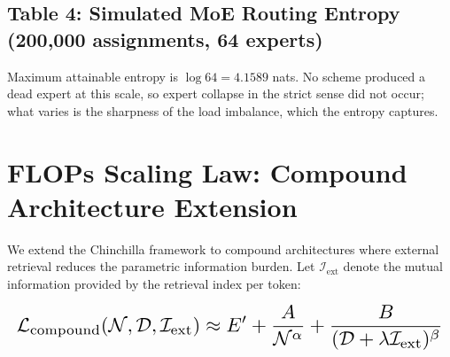 \documentclass{article}
\begin{document}
\subsection{Table 4: Simulated MoE Routing Entropy (200{,}000 assignments, 64 experts)}
\begin{table}[htbp]
\centering
{}
\end{table}

Maximum attainable entropy is $\log 64 = 4.1589$ nats. No scheme produced a dead expert at this scale, so expert collapse in the strict sense did not occur; what varies is the sharpness of the load imbalance, which the entropy captures.



\section{FLOPs Scaling Law: Compound Architecture Extension}


We extend the Chinchilla framework to compound architectures where external retrieval reduces the parametric information burden. Let $\mathcal{I}_{\text{ext}}$ denote the mutual information provided by the retrieval index per token:















\begin{equation}
\resizebox{\columnwidth}{!}{$\displaystyle
\begin{aligned}
\mathcal{L}_{\text{compound}}(\mathcal{N}, \mathcal{D}, \mathcal{I}_{\text{ext}}) \approx E' + \frac{A}{\mathcal{N}^\alpha} + \frac{B}{(\mathcal{D} + \lambda\mathcal{I}_{\text{ext}})^\beta}
\end{aligned}
$}
\end{equation}
\end{document}
